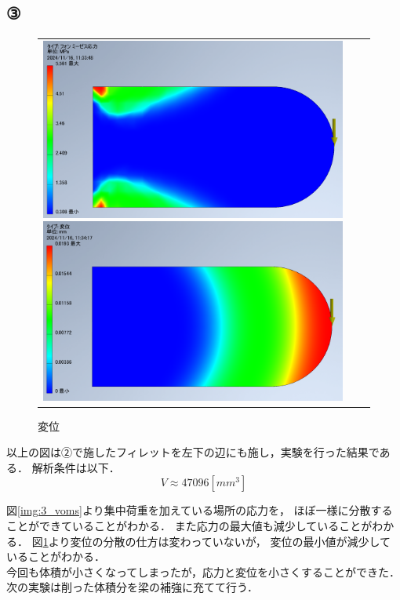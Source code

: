\subsection{③}
  \begin{figure}[H]
    \begin{tabular}{ccc}
      \begin{minipage}{.5\textwidth}
        \centering
        \includegraphics[width=0.99\linewidth]{images/3_voms.png}
        \caption{応力}
        \label{img:3_voms}
      \end{minipage}
      \begin{minipage}{.5\textwidth}
        \centering
        \includegraphics[width=0.99\linewidth]{images/3_disp.png}
        \caption{変位}
        \label{img:3_disp}
      \end{minipage}
    \end{tabular}
  \end{figure}

  以上の図は②で施したフィレットを左下の辺にも施し，実験を行った結果である．
  解析条件は以下．
  \begin{equation*}
    V \approx 47096[mm^3]
  \end{equation*}

  図\ref{img:3_voms}より集中荷重を加えている場所の応力を，
  ほぼ一様に分散することができていることがわかる．
  また応力の最大値も減少していることがわかる．
  図\ref{img:3_disp}より変位の分散の仕方は変わっていないが，
  変位の最小値が減少していることがわかる．\\\indent
  今回も体積が小さくなってしまったが，応力と変位を小さくすることができた．\\\indent
  次の実験は削った体積分を梁の補強に充てて行う．
